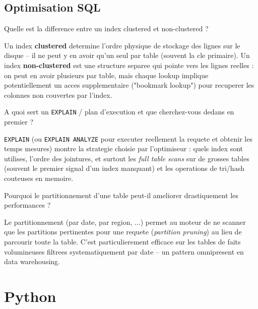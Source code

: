 \documentclass[11pt,a4paper]{article}
\begin{document}
\subsection{Optimisation SQL}

\begin{question} Quelle est la difference entre un index clustered et non-clustered ?
\end{question}
\begin{reponse}
Un index \textbf{clustered} determine l'ordre physique de stockage des lignes sur le disque -- il ne peut y en avoir qu'un seul par table (souvent la cle primaire). Un index \textbf{non-clustered} est une structure separee qui pointe vers les lignes reelles : on peut en avoir plusieurs par table, mais chaque lookup implique potentiellement un acces supplementaire ("bookmark lookup") pour recuperer les colonnes non couvertes par l'index.
\end{reponse}

\begin{question} A quoi sert un \texttt{EXPLAIN} / plan d'execution et que cherchez-vous dedans en premier ?
\end{question}
\begin{reponse}
\texttt{EXPLAIN} (ou \texttt{EXPLAIN ANALYZE} pour executer reellement la requete et obtenir les temps mesures) montre la strategie choisie par l'optimiseur : quels index sont utilises, l'ordre des jointures, et surtout les \emph{full table scans} sur de grosses tables (souvent le premier signal d'un index manquant) et les operations de tri/hash couteuses en memoire.
\end{reponse}

\begin{question} Pourquoi le partitionnement d'une table peut-il ameliorer drastiquement les performances ?
\end{question}
\begin{reponse}
Le partitionnement (par date, par region, ...) permet au moteur de ne scanner que les partitions pertinentes pour une requete (\emph{partition pruning}) au lieu de parcourir toute la table. C'est particulierement efficace sur les tables de faits volumineuses filtrees systematiquement par date -- un pattern omnipresent en data warehousing.
\end{reponse}

\newpage
\section{Python}
\end{document}
